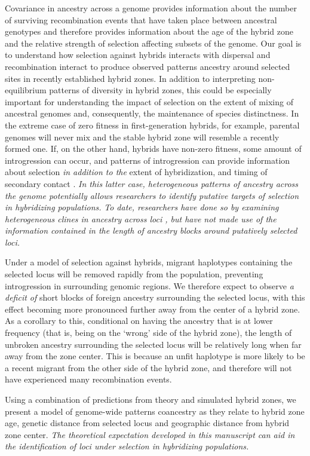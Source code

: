 \documentclass[12pt]{article}
\newcommand{\yb}[1]{{\em \color{magenta} #1}}
\begin{document}
Covariance in ancestry across a genome provides information about the number of surviving recombination events that have taken place between ancestral genotypes and therefore provides information about the age of the hybrid zone and the relative strength of selection affecting subsets of the genome. Our goal is to understand how selection against hybrids interacts with dispersal and recombination interact to produce observed patterns ancestry around selected sites in recently established hybrid zones. In addition to interpreting non-equilibrium patterns of diversity in hybrid zones, this could be especially important for understanding the impact of selection on the extent of mixing of ancestral genomes and, consequently, the maintenance of species distinctness. In the extreme case of zero fitness in first-generation hybrids, for example, parental genomes will never mix and the stable hybrid zone will resemble a recently formed one. 
If, on the other hand, hybrids have non-zero fitness, some amount of introgression can occur, and  patterns of introgression can provide information about selection \yb{in addition to the} extent of hybridization, and timing of secondary contact \citep{Price2009, Hellenthal2014}. 
\yb{In this latter case, heterogeneous patterns of ancestry across the genome potentially allows researchers to identify putative targets of selection in hybridizing populations.}  
\yb{To date, researchers have done so by examining heterogeneous clines in ancestry across loci \citep{Porter1997, Gompert2012}, but have not made use of the information contained in the length of ancestry blocks around putatively selected loci.}  

Under a model of selection against hybrids, migrant haplotypes containing the selected locus will be removed rapidly from the population, preventing introgression in surrounding genomic regions. We therefore expect to observe \yb{a deficit of} short blocks of foreign ancestry surrounding the selected locus, with this effect becoming more pronounced further away from the center of a hybrid zone. As a corollary to this, conditional on having the ancestry that is at lower frequency (that is, being on the `wrong' side of the hybrid zone), the length of unbroken ancestry surrounding the selected locus will be relatively long when far away from the zone center.  This is because an unfit haplotype is more likely to be a recent migrant from the other side of the hybrid zone, and therefore will not have experienced many recombination events. 

Using a combination of predictions from theory and simulated hybrid zones, we present a model of genome-wide patterns coancestry as they relate to hybrid zone age, genetic distance from selected locus and geographic distance from hybrid zone center.  
\yb{The theoretical expectation developed in this manuscript can aid in the identification of loci under selection in hybridizing populations.} 
\end{document}

